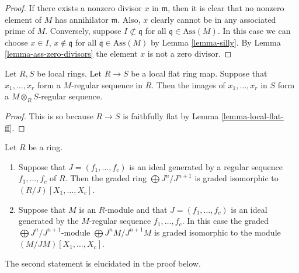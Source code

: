 \begin{proof}
If there exists a nonzero divisor $x$ in $\mathfrak m$,
then it is clear that no nonzero element of $M$ has annihilator
$\mathfrak m$. Also, $x$ clearly cannot be in any associated
prime of $M$. Conversely, suppose $I \not \subset \mathfrak q$
for all $\mathfrak q \in \text{Ass}(M)$. In this case we can
choose $x \in I$, $x \not \in \mathfrak q$ for all
$\mathfrak q \in \text{Ass}(M)$ by Lemma \ref{lemma-silly}.
By Lemma \ref{lemma-ass-zero-divisors} the element $x$
is not a zero divisor.
\end{proof}

\begin{lemma}
\label{lemma-flat-increases-depth}
Let $R, S$ be local rings.
Let $R \to S$ be a local flat ring map.
Suppose that $x_1, \ldots, x_r$ form
a $M$-regular sequence in $R$.
Then the images of $x_1, \ldots, x_r$ in
$S$ form a $M\otimes_RS$-regular sequence.
\end{lemma}

\begin{proof}
This is so because $R\to S$ is faithfully flat
by Lemma \ref{lemma-local-flat-ff}.
\end{proof}

\begin{lemma}
\label{lemma-regular-quasi-regular}
Let $R$ be a ring.
\begin{enumerate}
\item Suppose that $J = (f_1, \ldots, f_c)$ is an ideal generated
by a regular sequence $f_1, \ldots, f_c$ of $R$. Then the graded
ring $\bigoplus J^n/J^{n + 1}$ is graded isomorphic to
$(R/J)[X_1, \ldots, X_c]$.
\item Suppose that $M$ is an $R$-module and that $J = (f_1, \ldots, f_c)$
is an ideal generated by the $M$-regular sequence
$f_1, \ldots, f_c$. In this case the graded
$\bigoplus J^n/J^{n + 1}$-module $\bigoplus J^nM/J^{n + 1}M$
is graded isomorphic to the module $(M/JM)[X_1, \ldots, X_c]$.
\end{enumerate}
The second statement is elucidated in the proof below.
\end{lemma}

